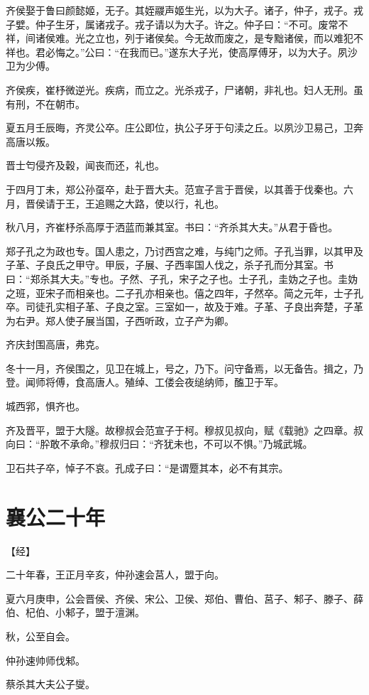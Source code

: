 \documentclass[a4paper,12pt,UTF8,twoside]{ctexbook}
\begin{document}
齐侯娶于鲁曰颜懿姬，无子。其姪鬷声姬生光，以为大子。诸子，仲子，戎子。戎子嬖。仲子生牙，属诸戎子。戎子请以为大子。许之。仲子曰：“不可。废常不祥，间诸侯难。光之立也，列于诸侯矣。今无故而废之，是专黜诸侯，而以难犯不祥也。君必悔之。”公曰：“在我而已。”遂东大子光，使高厚傅牙，以为大子。夙沙卫为少傅。

齐侯疾，崔杼微逆光。疾病，而立之。光杀戎子，尸诸朝，非礼也。妇人无刑。虽有刑，不在朝市。

夏五月壬辰晦，齐灵公卒。庄公即位，执公子牙于句渎之丘。以夙沙卫易己，卫奔高唐以叛。

晋士匄侵齐及穀，闻丧而还，礼也。

于四月丁未，郑公孙虿卒，赴于晋大夫。范宣子言于晋侯，以其善于伐秦也。六月，晋侯请于王，王追赐之大路，使以行，礼也。

秋八月，齐崔杼杀高厚于洒蓝而兼其室。书曰：“齐杀其大夫。”从君于昏也。

郑子孔之为政也专。国人患之，乃讨西宫之难，与纯门之师。子孔当罪，以其甲及子革、子良氏之甲守。甲辰，子展、子西率国人伐之，杀子孔而分其室。书曰：“郑杀其大夫。”专也。子然、子孔，宋子之子也。士子孔，圭妫之子也。圭妫之班，亚宋子而相亲也。二子孔亦相亲也。僖之四年，子然卒。简之元年，士子孔卒。司徒孔实相子革、子良之室。三室如一，故及于难。子革、子良出奔楚，子革为右尹。郑人使子展当国，子西听政，立子产为卿。

齐庆封围高唐，弗克。

冬十一月，齐侯围之，见卫在城上，号之，乃下。问守备焉，以无备告。揖之，乃登。闻师将傅，食高唐人。殖绰、工偻会夜缒纳师，醢卫于军。

城西郛，惧齐也。

齐及晋平，盟于大隧。故穆叔会范宣子于柯。穆叔见叔向，赋《载驰》之四章。叔向曰：“肸敢不承命。”穆叔归曰：“齐犹未也，不可以不惧。”乃城武城。

卫石共子卒，悼子不哀。孔成子曰：“是谓蹷其本，必不有其宗。

\chapter{襄公二十年}



【经】

二十年春，王正月辛亥，仲孙速会莒人，盟于向。

夏六月庚申，公会晋侯、齐侯、宋公、卫侯、郑伯、曹伯、莒子、邾子、滕子、薛伯、杞伯、小邾子，盟于澶渊。

秋，公至自会。

仲孙速帅师伐邾。

蔡杀其大夫公子燮。
\end{document}
